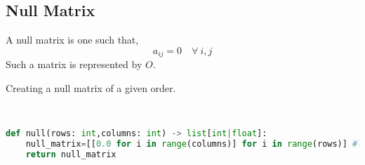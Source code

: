 \subsection{Null Matrix}
A null matrix is one such that,
\[a_{ij}=0 \quad \forall \ i,j\]
Such a matrix is represented by $O$.
\begin{eg}
	Creating a null matrix of a given order.
\end{eg}
\begin{explanation} \phantom \\
	\begin{lstlisting}[language=Python, numbers=none]
def null(rows: int,columns: int) -> list[int|float]:
	null_matrix=[[0.0 for i in range(columns)] for i in range(rows)] #loop over columns then over rows
	return null_matrix \end{lstlisting}
\end{explanation}

